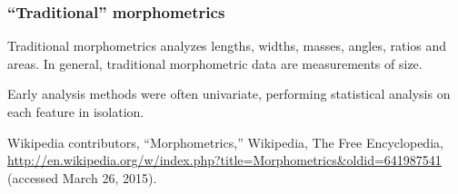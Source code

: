 \begin{frame}
\frametitle{``Traditional'' morphometrics}
Traditional morphometrics analyzes lengths, widths, masses, angles, ratios and areas.
In general, traditional morphometric data are measurements of size.


Early analysis methods were often univariate, performing statistical analysis on each feature in isolation.

\vspace{0.25cm}
\begin{tiny}
Wikipedia contributors, ``Morphometrics,'' Wikipedia, The Free Encyclopedia, \url{http://en.wikipedia.org/w/index.php?title=Morphometrics&oldid=641987541} (accessed March 26, 2015).\par
\end{tiny}
\end{frame}



